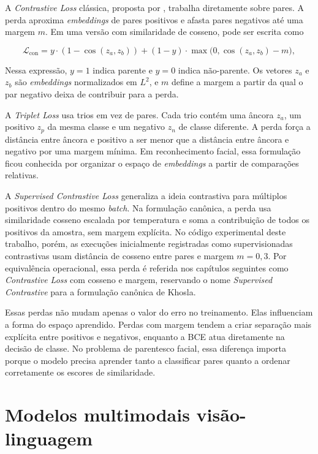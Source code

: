 A \textit{Contrastive Loss} clássica, proposta por , trabalha diretamente sobre pares. A perda aproxima \textit{embeddings} de pares positivos e afasta pares negativos até uma margem $m$. Em uma versão com similaridade de cosseno, pode ser escrita como

\begin{equation}
\mathcal{L}_{\text{con}} = y \cdot (1 - \cos(z_a, z_b)) + (1 - y) \cdot \max\!\big(0, \cos(z_a, z_b) - m\big),
\label{eq:contrastive}
\end{equation}

Nessa expressão, $y=1$ indica parente e $y=0$ indica não-parente. Os vetores $z_a$ e $z_b$ são \textit{embeddings} normalizados em $L^2$, e $m$ define a margem a partir da qual o par negativo deixa de contribuir para a perda.

A \textit{Triplet Loss}  usa trios em vez de pares. Cada trio contém uma âncora $z_a$, um positivo $z_p$ da mesma classe e um negativo $z_n$ de classe diferente. A perda força a distância entre âncora e positivo a ser menor que a distância entre âncora e negativo por uma margem mínima. Em reconhecimento facial, essa formulação ficou conhecida por organizar o espaço de \textit{embeddings} a partir de comparações relativas.

A \textit{Supervised Contrastive Loss} \cite{khosla2020supervised} generaliza a ideia contrastiva para múltiplos positivos dentro do mesmo \textit{batch}. Na formulação canônica, a perda usa similaridade cosseno escalada por temperatura e soma a contribuição de todos os positivos da amostra, sem margem explícita. No código experimental deste trabalho, porém, as execuções inicialmente registradas como supervisionadas contrastivas usam distância de cosseno entre pares e margem $m = 0{,}3$. Por equivalência operacional, essa perda é referida nos capítulos seguintes como \textit{Contrastive Loss} com cosseno e margem, reservando o nome \textit{Supervised Contrastive} para a formulação canônica de Khosla.

Essas perdas não mudam apenas o valor do erro no treinamento. Elas influenciam a forma do espaço aprendido. Perdas com margem tendem a criar separação mais explícita entre positivos e negativos, enquanto a BCE atua diretamente na decisão de classe. No problema de parentesco facial, essa diferença importa porque o modelo precisa aprender tanto a classificar pares quanto a ordenar corretamente os escores de similaridade.

\section{Modelos multimodais visão-linguagem}

